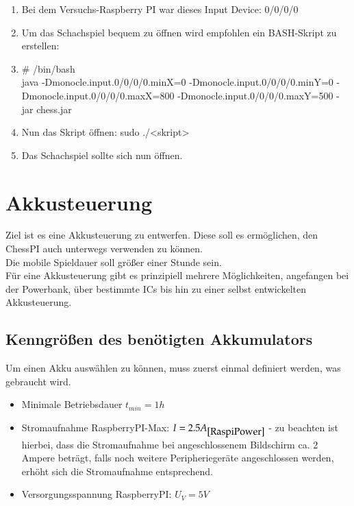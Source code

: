 \documentclass[12pt,a4paper]{article}
\begin{document}
{\begin{enumerate}
	\item{Bei dem Versuchs-Raspberry PI war dieses Input Device: 0/0/0/0}
	\item{Um das Schachspiel bequem zu öffnen wird empfohlen ein BASH-Skript zu erstellen:}
	\item{\# /bin/bash \\
	java -Dmonocle.input.0/0/0/0.minX=0 -Dmonocle.input.0/0/0/0.minY=0 -Dmonocle.input.0/0/0/0.maxX=800 -Dmonocle.input.0/0/0/0.maxY=500 -jar chess.jar}
	\item{Nun das Skript öffnen: sudo ./<skript>}
	\item{Das Schachspiel sollte sich nun öffnen.}
\end{enumerate}
	


\clearpage\vfill\newpage{}
\section{Akkusteuerung}
\label{SEC:AKKUSTEUR}

Ziel ist es eine Akkusteuerung zu entwerfen. Diese soll es ermöglichen, den ChessPI auch unterwegs verwenden zu können. \\
Die mobile Spieldauer soll größer einer Stunde sein. \\[1ex]
Für eine Akkusteuerung gibt es prinzipiell mehrere Möglichkeiten, angefangen bei der Powerbank, über bestimmte ICs bis hin zu einer selbst entwickelten Akkusteuerung. \\

\subsection{Kenngrößen des benötigten Akkumulators}
\label{SUBSEC:AKKU-NEEDS}

Um einen Akku auswählen zu können, muss zuerst einmal definiert werden, was gebraucht wird.\\
\begin{itemize}
	\item{Minimale Betriebsdauer $t_{min}= 1h$}
	\item{Stromaufnahme RaspberryPI-Max: $I=2.5A_{\cite{RaspiPower}}$ - zu beachten ist hierbei, dass die Stromaufnahme bei angeschlossenem Bildschirm ca. 2 Ampere beträgt, falls noch weitere Peripheriegeräte angeschlossen werden, erhöht sich die Stromaufnahme entsprechend.}
	\item{Versorgungsspannung RaspberryPI: $U_V = 5V$}
\end{itemize}

}
\end{document}
